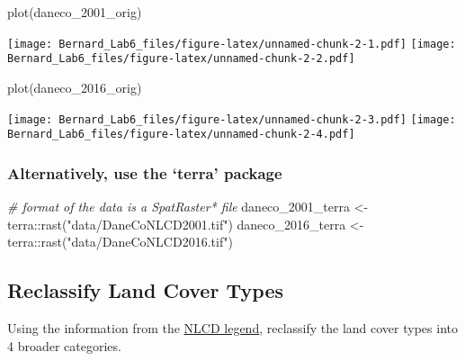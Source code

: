 \documentclass[
]{article}
\newenvironment{Shaded}{\begin{snugshade}}{\end{snugshade}}
\newcommand{\CommentTok}[1]{\textcolor[rgb]{0.56,0.35,0.01}{\textit{#1}}}
\newcommand{\FunctionTok}[1]{\textcolor[rgb]{0.00,0.00,0.00}{#1}}
\newcommand{\NormalTok}[1]{#1}
\newcommand{\OtherTok}[1]{\textcolor[rgb]{0.56,0.35,0.01}{#1}}
\newcommand{\SpecialCharTok}[1]{\textcolor[rgb]{0.00,0.00,0.00}{#1}}
\newcommand{\StringTok}[1]{\textcolor[rgb]{0.31,0.60,0.02}{#1}}
\begin{document}
\begin{Shaded}
\begin{Highlighting}[]
\FunctionTok{plot}\NormalTok{(daneco\_2001\_orig)}
\end{Highlighting}
\end{Shaded}

\texttt{[image: Bernard\_Lab6\_files/figure-latex/unnamed-chunk-2-1.pdf]}
\texttt{[image: Bernard\_Lab6\_files/figure-latex/unnamed-chunk-2-2.pdf]}

\begin{Shaded}
\begin{Highlighting}[]
\FunctionTok{plot}\NormalTok{(daneco\_2016\_orig)}
\end{Highlighting}
\end{Shaded}

\texttt{[image: Bernard\_Lab6\_files/figure-latex/unnamed-chunk-2-3.pdf]}
\texttt{[image: Bernard\_Lab6\_files/figure-latex/unnamed-chunk-2-4.pdf]}

\hypertarget{alternatively-use-the-terra-package}{%
\subsubsection{Alternatively, use the `terra'
package}\label{alternatively-use-the-terra-package}}

\begin{Shaded}
\begin{Highlighting}[]
\CommentTok{\# format of the data is a SpatRaster* file}
\NormalTok{daneco\_2001\_terra }\OtherTok{\textless{}{-}}\NormalTok{ terra}\SpecialCharTok{::}\FunctionTok{rast}\NormalTok{(}\StringTok{"data/DaneCoNLCD2001.tif"}\NormalTok{)}
\NormalTok{daneco\_2016\_terra }\OtherTok{\textless{}{-}}\NormalTok{ terra}\SpecialCharTok{::}\FunctionTok{rast}\NormalTok{(}\StringTok{"data/DaneCoNLCD2016.tif"}\NormalTok{)}
\end{Highlighting}
\end{Shaded}

\hypertarget{reclassify-land-cover-types}{%
\subsection{Reclassify Land Cover
Types}\label{reclassify-land-cover-types}}

Using the information from the
\href{https://www.mrlc.gov/data/legends/national-land-cover-database-class-legend-and-description}{NLCD
legend}, reclassify the land cover types into 4 broader categories.
\end{document}
